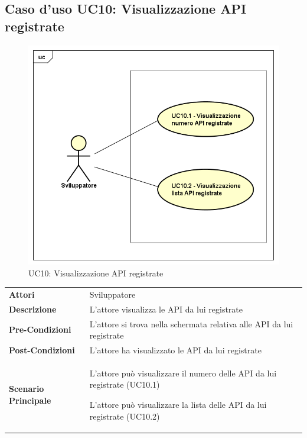\newpage
\subsection{Caso d'uso UC10: Visualizzazione API registrate}
\label{UC10}
\begin{figure}[ht]
	\centering
	\includegraphics[scale=0.45]{UML/UC10.png}
	\caption{UC10: Visualizzazione API registrate}
\end{figure}

\begin{longtable}{ l | p{11cm}}
	\hline
	\rowcolor{Gray}
	\multicolumn{2}{c}{UC10 - Visualizzazione API registrate}\\
	\hline
	\textbf{Attori} & Sviluppatore \\
	\textbf{Descrizione} & L'attore visualizza le API da lui registrate \\
	\textbf{Pre-Condizioni} & L'attore si trova nella schermata relativa alle API da lui registrate \\
	\textbf{Post-Condizioni} & L'attore ha visualizzato le API da lui registrate \\
	\textbf{Scenario Principale} & 
	\begin{enumerate*}[label=(\arabic*.),itemjoin={\newline}]
		\item L'attore può visualizzare il numero delle API da lui registrate (UC10.1)
		\item L'attore può visualizzare la lista delle API da lui registrate (UC10.2)
	\end{enumerate*}\\
\end{longtable}

